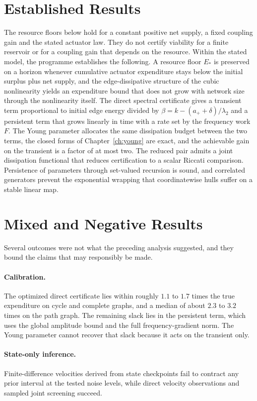 \documentclass[11pt,notitlepage]{report}
\theoremstyle{definition}
\theoremstyle{remark}
\begin{document}
\section{Established Results}
The resource floors below hold for a constant positive net supply, a fixed coupling gain and the stated actuator law. They do not certify viability for a finite reservoir or for a coupling gain that depends on the resource.
Within the stated model, the programme establishes the following. A resource floor $E_*$ is preserved on a horizon whenever cumulative actuator expenditure stays below the initial surplus plus net supply, and the edge-dissipative structure of the cubic nonlinearity yields an expenditure bound that does not grow with network size through the nonlinearity itself. The direct spectral certificate gives a transient term proportional to initial edge energy divided by $\beta=k-(a_++\delta)/\lambda_2$ and a persistent term that grows linearly in time with a rate set by the frequency work $F$. The Young parameter allocates the same dissipation budget between the two terms, the closed forms of Chapter~\ref{ch:young} are exact, and the achievable gain on the transient is a factor of at most two. The reduced pair admits a joint dissipation functional that reduces certification to a scalar Riccati comparison. Persistence of parameters through set-valued recursion is sound, and correlated generators prevent the exponential wrapping that coordinatewise hulls suffer on a stable linear map.

\section{Mixed and Negative Results}
Several outcomes were not what the preceding analysis suggested, and they bound the claims that may responsibly be made.
\paragraph{Calibration.} The optimized direct certificate lies within roughly $1.1$ to $1.7$ times the true expenditure on cycle and complete graphs, and a median of about $2.3$ to $3.2$ times on the path graph. The remaining slack lies in the persistent term, which uses the global amplitude bound and the full frequency-gradient norm. The Young parameter cannot recover that slack because it acts on the transient only.
\paragraph{State-only inference.} Finite-difference velocities derived from state checkpoints fail to contract any prior interval at the tested noise levels, while direct velocity observations and sampled joint screening succeed.
\end{document}
